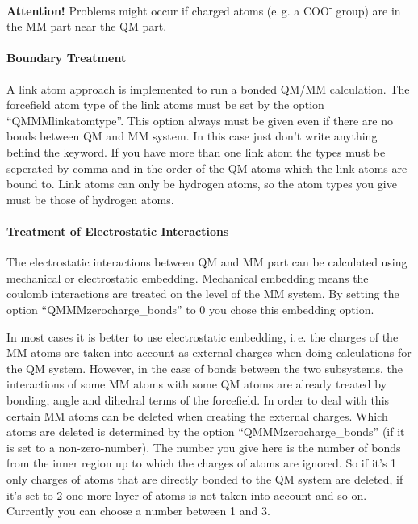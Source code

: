 \documentclass[10pt,a4paper]{article} %
\begin{document}
\textbf{Attention!} Problems might occur if charged atoms (e.\,g. a COO\textsuperscript{-} group) are in the MM part near the QM part.

\paragraph{Boundary Treatment \\}

A link atom approach is implemented to run a bonded QM/MM calculation. The forcefield atom type of the link atoms must be set by the option ``QMMMlinkatomtype''. This option always must be given even if there are no bonds between QM and MM system. In this case just don't write anything behind the keyword. If you have more than one link atom the types must be seperated by comma and in the order of the QM atoms which the link atoms are bound to. Link atoms can only be hydrogen atoms, so the atom types you give must be those of hydrogen atoms.

\paragraph{Treatment of Electrostatic Interactions\\}

The electrostatic interactions between QM and MM part can be calculated using mechanical  or electrostatic embedding. Mechanical embedding means the coulomb interactions are treated on the level of the MM system. By setting the option ``QMMMzerocharge\_bonds'' to 0 you chose this embedding option.

In most cases it is better to use electrostatic embedding, i.\,e. the charges of the MM atoms are taken into account as external charges when doing calculations for the QM system. However, in the case of bonds between the two subsystems, the interactions of some MM atoms with some QM atoms are already treated by bonding, angle and dihedral terms of the forcefield. In order to deal with this certain MM atoms can be deleted when creating the external charges. Which atoms are deleted is determined by the option ``QMMMzerocharge\_bonds'' (if it is set to a non-zero-number). The number you give here is the number of bonds from the inner region up to which the charges of atoms are ignored. So if it's 1 only charges of atoms that are directly bonded to the QM system are deleted, if it's set to 2 one more layer of atoms is not taken into account and so on. Currently you can choose a number between 1 and 3.
\end{document}
